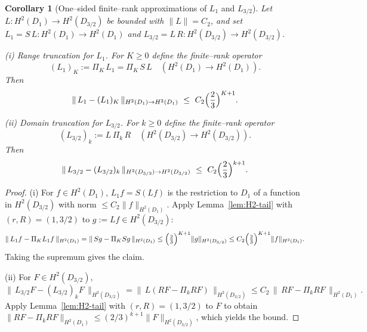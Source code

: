 \documentclass[11pt]{article}
\newtheorem{corollary}[definition]{Corollary}
\begin{document}



\begin{corollary}[One–sided finite–rank approximations of $L_{1}$ and $L_{3/2}$]
\label{cor:one-sided-approxs}
Let $L:H^2(D_1)\to H^2(D_{3/2})$ be bounded with $\|L\|=C_2$, and set
$L_{1}=S\,L:H^2(D_1)\to H^2(D_1)$ and $L_{3/2}=L\,R:H^2(D_{3/2})\to H^2(D_{3/2})$.

\smallskip
\noindent\textup{(i) Range truncation for $L_{1}$.}
For $K\ge0$ define the finite–rank operator
\[
(L_{1})_{K}:=\Pi_{K}\,L_{1}=\Pi_{K}\,S\,L\quad(H^2(D_1)\to H^2(D_1)).
\]
Then
\[
\|\,L_{1}-(L_{1})_{K}\,\|_{H^2(D_1)\to H^2(D_1)}
\ \le\ C_2\Bigl(\frac{2}{3}\Bigr)^{K+1}.
\]

\noindent\textup{(ii) Domain truncation for $L_{3/2}$.}
For $k\ge0$ define the finite–rank operator
\[
(L_{3/2})_{k}:=L\,\Pi_{k}\,R\quad(H^2(D_{3/2})\to H^2(D_{3/2})).
\]
Then
\[
\|\,L_{3/2}-(L_{3/2})_{k}\,\|_{H^2(D_{3/2})\to H^2(D_{3/2})}
\ \le\ C_2\Bigl(\frac{2}{3}\Bigr)^{k+1}.
\]
\end{corollary}

\begin{proof}
(i) For $f\in H^2(D_1)$, $L_{1}f=S(Lf)$ is the restriction to $D_1$ of a function in $H^2(D_{3/2})$
with norm $\le C_2\|f\|_{H^2(D_1)}$. Apply Lemma~\ref{lem:H2-tail} with $(r,R)=(1,3/2)$ to
$g:=L f\in H^2(D_{3/2})$:
\[
\|\,L_{1}f-\Pi_{K}L_{1}f\,\|_{H^2(D_1)}=\|\,Sg-\Pi_K Sg\,\|_{H^2(D_1)}
\le \Bigl(\tfrac{2}{3}\Bigr)^{K+1}\|g\|_{H^2(D_{3/2})}
\le C_2\Bigl(\tfrac{2}{3}\Bigr)^{K+1}\|f\|_{H^2(D_1)}.
\]
Taking the supremum gives the claim.

(ii) For $F\in H^2(D_{3/2})$,
\[
\|\,L_{3/2}F-(L_{3/2})_{k}F\,\|_{H^2(D_{3/2})}
=\|\,L(RF-\Pi_k RF)\,\|_{H^2(D_{3/2})}
\le C_2\,\|\,RF-\Pi_k RF\,\|_{H^2(D_1)}.
\]
Apply Lemma~\ref{lem:H2-tail} with $(r,R)=(1,3/2)$ to $F$ to obtain
$\|RF-\Pi_k RF\|_{H^2(D_1)}\le (2/3)^{k+1}\|F\|_{H^2(D_{3/2})}$, which yields the bound.
\end{proof}
\end{document}
